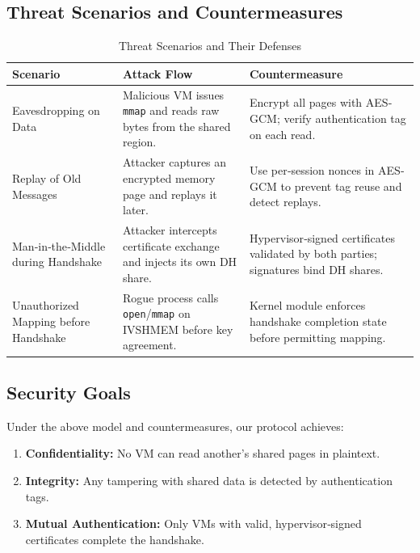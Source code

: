 \documentclass[conference]{IEEEtran}
\begin{document}
\subsection{Threat Scenarios and Countermeasures}

\begin{table}[!t]
  \centering
  \begin{tabular}{p{4cm} p{7cm} p{6cm}}
    \toprule
    \textbf{Scenario} & \textbf{Attack Flow} & \textbf{Countermeasure} \\
    \midrule
    Eavesdropping on Data &
      Malicious VM issues \texttt{mmap} and reads raw bytes from the shared region. &
      Encrypt all pages with AES‐GCM; verify authentication tag on each read. \\
    \addlinespace
    Replay of Old Messages &
      Attacker captures an encrypted memory page and replays it later. &
      Use per‐session nonces in AES‐GCM to prevent tag reuse and detect replays. \\
    \addlinespace
    Man‐in‐the‐Middle during Handshake &
      Attacker intercepts certificate exchange and injects its own DH share. &
      Hypervisor‐signed certificates validated by both parties; signatures bind DH shares. \\
    \addlinespace
    Unauthorized Mapping before Handshake &
      Rogue process calls \texttt{open}/\texttt{mmap} on IVSHMEM before key agreement. &
      Kernel module enforces handshake completion state before permitting mapping. \\
    \bottomrule
  \end{tabular}
  \caption{Threat Scenarios and Their Defenses}
\end{table}

\subsection{Security Goals}
Under the above model and countermeasures, our protocol achieves:
\begin{enumerate}
  \item \textbf{Confidentiality:} No VM can read another’s shared pages in plaintext.
  \item \textbf{Integrity:} Any tampering with shared data is detected by authentication tags.
  \item \textbf{Mutual Authentication:} Only VMs with valid, hypervisor‐signed certificates complete the handshake.
\end{enumerate}
\end{document}
